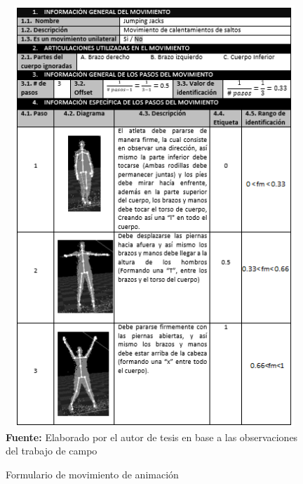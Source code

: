 \begin{figure}[H]
	\caption{Formulario de movimiento de animaci\'on}
	\label{fig:frmMovCheer}
	\centering
	\includegraphics[width=445px,height=600px]{graphics/resultados/movimientoCheerleader.PNG} \\
	\textbf{Fuente:} Elaborado por el autor de tesis en base a las observaciones del trabajo de campo
\end{figure}
